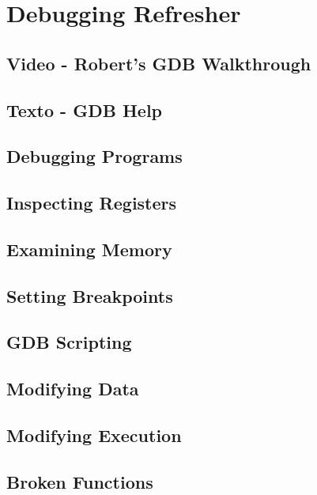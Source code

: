 \section{Debugging Refresher}\label{sec:debugging_refresher}
\subsection{Video - Robert's GDB Walkthrough}\label{subsec:video_roberts_gdb_walkthrough}
\subsection{Texto - GDB Help}\label{subsec:texto_gdb_help}
\subsection{Debugging Programs}\label{subsec:debugging_programs}
\subsection{Inspecting Registers}\label{subsec:inspecting_registers}
\subsection{Examining Memory}\label{subsec:examining_memory}
\subsection{Setting Breakpoints}\label{subsec:setting_breakpoints}
\subsection{GDB Scripting}\label{subsec:gdb_scripting}
\subsection{Modifying Data}\label{subsec:modifying_data}
\subsection{Modifying Execution}\label{subsec:modifying_execution}
\subsection{Broken Functions}\label{subsec:broken_functions}
